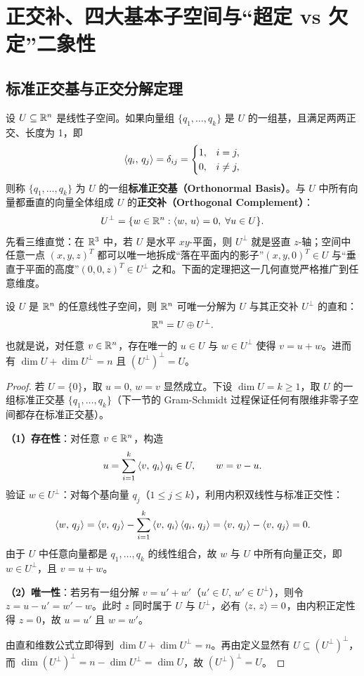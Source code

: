 \section{正交补、四大基本子空间与“超定 vs 欠定”二象性}\label{sec:four-subspaces}

\subsection{标准正交基与正交分解定理}

设 $U \subseteq \mathbb{R}^n$ 是线性子空间。如果向量组 $\{q_1, \dots, q_k\}$ 是 $U$ 的一组基，且满足两两正交、长度为 1，即
\[
\left\langle q_i,\, q_j \right\rangle = \delta_{ij} = \begin{cases} 1, & i = j, \\ 0, & i \neq j, \end{cases}
\]
则称 $\{q_1, \dots, q_k\}$ 为 $U$ 的一组\textbf{标准正交基（Orthonormal Basis）}。与 $U$ 中所有向量都垂直的向量全体组成 $U$ 的\textbf{正交补（Orthogonal Complement）}：
\[
U^\perp = \{w \in \mathbb{R}^n : \left\langle w,\, u \right\rangle = 0,\; \forall u \in U\}.
\]
先看三维直觉：在 $\mathbb{R}^3$ 中，若 $U$ 是水平 $xy$-平面，则 $U^\perp$ 就是竖直 $z$-轴；空间中任意一点 $(x, y, z)^T$ 都可以唯一地拆成“落在平面内的影子”$(x, y, 0)^T \in U$ 与“垂直于平面的高度”$(0, 0, z)^T \in U^\perp$ 之和。下面的定理把这一几何直觉严格推广到任意维度。

\begin{thmBox}
\begin{theorem}[正交分解定理]\label{thm:ortho-decomp}
设 $U$ 是 $\mathbb{R}^n$ 的任意线性子空间，则 $\mathbb{R}^n$ 可唯一分解为 $U$ 与其正交补 $U^\perp$ 的直和：
\[
\mathbb{R}^n = U \oplus U^\perp.
\]
也就是说，对任意 $v \in \mathbb{R}^n$，存在唯一的 $u \in U$ 与 $w \in U^\perp$ 使得 $v = u + w$。进而有 $\dim U + \dim U^\perp = n$ 且 $(U^\perp)^\perp = U$。
\end{theorem}
\end{thmBox}

\begin{proof}
若 $U = \{0\}$，取 $u = 0,\, w = v$ 显然成立。下设 $\dim U = k \ge 1$，取 $U$ 的一组标准正交基 $\{q_1, \dots, q_k\}$（下一节的 Gram-Schmidt 过程保证任何有限维非零子空间都存在标准正交基）。

\textbf{（1）存在性}：对任意 $v \in \mathbb{R}^n$，构造
\[
u = \sum_{i=1}^{k} \left\langle v,\, q_i \right\rangle q_i \in U, \qquad w = v - u.
\]
验证 $w \in U^\perp$：对每个基向量 $q_j$（$1 \le j \le k$），利用内积双线性与标准正交性：
\[
\left\langle w,\, q_j \right\rangle = \left\langle v,\, q_j \right\rangle - \sum_{i=1}^{k} \left\langle v,\, q_i \right\rangle \left\langle q_i,\, q_j \right\rangle
= \left\langle v,\, q_j \right\rangle - \left\langle v,\, q_j \right\rangle = 0.
\]
由于 $U$ 中任意向量都是 $q_1, \dots, q_k$ 的线性组合，故 $w$ 与 $U$ 中所有向量正交，即 $w \in U^\perp$，且 $v = u + w$。

\textbf{（2）唯一性}：若另有一组分解 $v = u' + w'$（$u' \in U,\, w' \in U^\perp$），则令 $z = u - u' = w' - w$。此时 $z$ 同时属于 $U$ 与 $U^\perp$，必有 $\left\langle z,\, z \right\rangle = 0$，由内积正定性得 $z = 0$，故 $u = u'$ 且 $w = w'$。

由直和维数公式立即得到 $\dim U + \dim U^\perp = n$。再由定义显然有 $U \subseteq (U^\perp)^\perp$，而 $\dim(U^\perp)^\perp = n - \dim U^\perp = \dim U$，故 $(U^\perp)^\perp = U$。
\end{proof}

